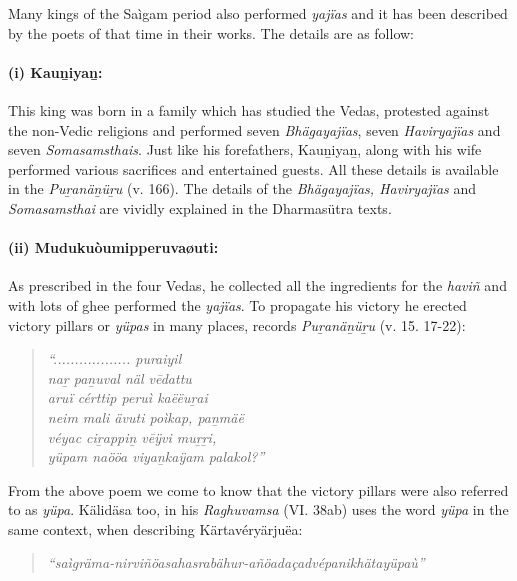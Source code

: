 Many kings of the Saìgam period also performed \textit{yajïas} and it has been described by the poets of that time in their works. The details are as follow:

\paragraph*{(i) Kauṉiyaṉ:}

This king was born in a family which has studied the Vedas, protested against the non-Vedic religions and performed seven \textit{Bhägayajïas}, seven \textit{Haviryajïas} and seven \textit{Somasamsthais}. Just like his forefathers, Kauṉiyaṉ, along with his wife performed various sacrifices and entertained guests. All these details is available in the \textit{Puṟanäṉüṟu} (v. 166). The details of the \textit{Bhägayajïas, Haviryajïas} and \textit{Somasamsthai} are vividly explained in the Dharmasütra texts.


\paragraph*{(ii) Mudukuòumipperuvaøuti:}

As prescribed in the four Vedas, he collected all the ingredients for the \textit{haviñ} and with lots of ghee performed the \textit{yajïas}. To propagate his victory he erected victory pillars or \textit{yüpas} in many places, records \textit{Puṟanäṉüṟu} (v. 15. 17-22):

\begin{verse}
\textit{“.................. puraiyil}\\\textit{naṟ paṉuval näl vēdattu}\\\textit{aruï cérttip peruì kaëëuṟai}\\\textit{neim mali ävuti poìkap, paṉmäë}\\\textit{véyac ciṟappiṉ vēÿvi muṟṟi,}\\\textit{yüpam naööa viyaṉkaÿam palakol?”}
\end{verse}

From the above poem we come to know that the victory pillars were also referred to as \textit{yüpa}. Kälidäsa too, in his \textit{Raghuvamsa} (VI. 38ab) uses the word \textit{yüpa} in the same context, when describing Kärtavéryärjuëa:

\begin{verse}
\textit{“saìgräma-nirviñöasahasrabähur-añöadaçadvépanikhätayüpaù”}
\end{verse}

